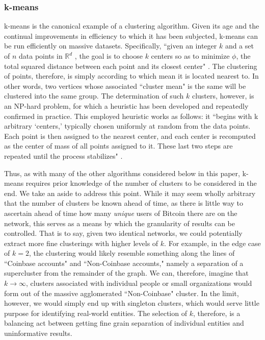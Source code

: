 \documentclass{article}
\begin{document}
\subsubsection{k-means}
k-means is the canonical example of a clustering algorithm. Given its age and the continual improvements in efficiency to which it has been subjected, k-means can be run efficiently on massive datasets. Specifically, ``given an integer $k$ and a set of $n$ data points in $\mathbb{R}^d$ , the goal is to choose $k$ centers so as to minimize $\phi$, the total squared distance between each point and its closest center" \cite{k-means}. The clustering of points, therefore, is simply according to which mean it is located nearest to. In other words, two vertices whose associated ``cluster mean" is the same will be clustered into the same group. The determination of such $k$ clusters, however, is an NP-hard problem, for which a heuristic has been developed and repeatedly confirmed in practice. This employed heuristic works as follows: it ``begins with k arbitrary `centers,' typically chosen uniformly at random from the data points. Each point is then assigned to the nearest center, and each center is recomputed as the center of mass of all points assigned to it. These last two steps are repeated until the process stabilizes" \cite{k-means}. 

Thus, as with many of the other algorithms considered below in this paper, k-means requires prior knowledge of the number of clusters to be considered in the end. We take an aside to address this point. While it may seem wholly arbitrary that the number of clusters be known ahead of time, as there is little way to ascertain ahead of time how many \textit{unique} users of Bitcoin there are on the network, this serves as a means by which the granularity of results can be controlled. That is to say, given two identical networks, we could potentially extract more fine clusterings with higher levels of $k$. For example, in the edge case of $k=2$, the clustering would likely resemble something along the lines of ``Coinbase accounts" and ``Non-Coinbase accounts," namely a separation of a supercluster from the remainder of the graph. We can, therefore, imagine that $k\rightarrow\infty$, clusters associated with individual people or small organizations would form out of the massive agglomerated ``Non-Coinbase" cluster. In the limit, however, we would simply end up with singleton clusters, which would serve little purpose for identifying real-world entities. The selection of $k$, therefore, is a balancing act between getting fine grain separation of individual entities and uninformative results.
\end{document}
